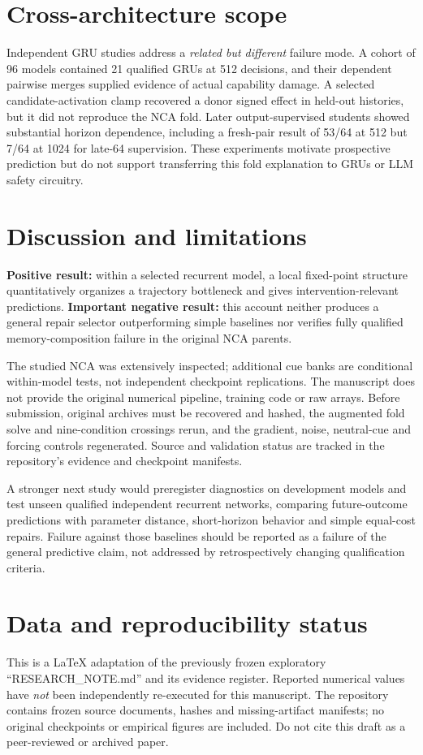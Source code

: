 \documentclass[10pt]{article}
\begin{document}
\section{Cross-architecture scope}
Independent GRU studies address a \emph{related but different} failure mode. A cohort of 96 models contained 21 qualified GRUs at 512 decisions, and their dependent pairwise merges supplied evidence of actual capability damage. A selected candidate-activation clamp recovered a donor signed effect in held-out histories, but it did not reproduce the NCA fold. Later output-supervised students showed substantial horizon dependence, including a fresh-pair result of 53/64 at 512 but 7/64 at 1024 for late-64 supervision. These experiments motivate prospective prediction but do not support transferring this fold explanation to GRUs or LLM safety circuitry.

\section{Discussion and limitations}
\textbf{Positive result:} within a selected recurrent model, a local fixed-point structure quantitatively organizes a trajectory bottleneck and gives intervention-relevant predictions. \textbf{Important negative result:} this account neither produces a general repair selector outperforming simple baselines nor verifies fully qualified memory-composition failure in the original NCA parents.

The studied NCA was extensively inspected; additional cue banks are conditional within-model tests, not independent checkpoint replications. The manuscript does not provide the original numerical pipeline, training code or raw arrays. Before submission, original archives must be recovered and hashed, the augmented fold solve and nine-condition crossings rerun, and the gradient, noise, neutral-cue and forcing controls regenerated. Source and validation status are tracked in the repository's evidence and checkpoint manifests.

A stronger next study would preregister diagnostics on development models and test unseen qualified independent recurrent networks, comparing future-outcome predictions with parameter distance, short-horizon behavior and simple equal-cost repairs. Failure against those baselines should be reported as a failure of the general predictive claim, not addressed by retrospectively changing qualification criteria.

\section*{Data and reproducibility status}
This is a LaTeX adaptation of the previously frozen exploratory ``RESEARCH\_NOTE.md'' and its evidence register. Reported numerical values have \emph{not} been independently re-executed for this manuscript. The repository contains frozen source documents, hashes and missing-artifact manifests; no original checkpoints or empirical figures are included. Do not cite this draft as a peer-reviewed or archived paper.
\end{document}

